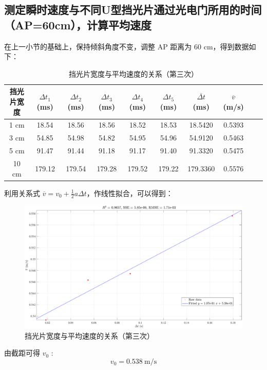 \documentclass[UTF8]{article}
\theoremstyle{MyLineTheoremStyle} %
\theoremstyle{MyBlockTheoremStyle} %
\theoremstyle{MySubsubsectionStyle} %
\begin{document}
\subsection{测定瞬时速度与不同U型挡光片通过光电门所用的时间（AP=60cm），计算平均速度}
在上一小节的基础上，保持倾斜角度不变，调整 AP 距离为 60 cm，得到数据如下：
\begin{table}[H]\centering
    \caption{挡光片宽度与平均速度的关系（第三次）}
\begin{tabular}{cccccccccc}\toprule
    挡光片宽度 & $\Delta t_1$ (ms) & $\Delta t_2$ (ms) & $\Delta t_3$ (ms) & $\Delta t_4$ (ms) & $\Delta t_5$ (ms) & $\overline{\Delta t}$ (ms) & $\overline{v}$ (m/s)  \\
    \midrule
    1 cm   &18.54	&18.56	&18.56	&18.52	&18.53	&18.5420	&0.5393 \\
    3  cm  &54.85	&54.98	&54.82	&54.95	&54.96	&54.9120	&0.5463 \\
    5  cm  &91.47	&91.44	&91.18	&91.17	&91.40	&91.3320	&0.5475 \\
    10  cm &179.12 &179.54	&179.28	&179.52	&179.22	&179.3360	&0.5576 \\
    \bottomrule
\end{tabular}
\end{table}
利用关系式 $\overline{v} = v_0 + \frac{1}{2}a \Delta t$，作线性拟合，可以得到：
\begin{figure}[H]\centering
    \includegraphics[width=0.9\columnwidth]{assets/10.pdf}
    \caption{挡光片宽度与平均速度的关系（第三次）}
\end{figure}
由截距可得 $v_0$ : 
\begin{equation}
v_0 = 0.538 \ \mathrm{m/s}
\end{equation}
\end{document}
